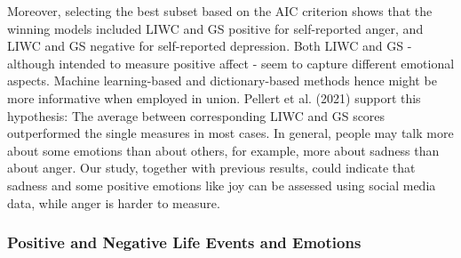 \documentclass[
  english,
  jou,floatsintext]{apa7}
\begin{document}
Moreover, selecting the best subset based on the AIC criterion shows that the winning models included LIWC and GS positive for self-reported anger, and LIWC and GS negative for self-reported depression. Both LIWC and GS - although intended to measure positive affect - seem to capture different emotional aspects. Machine learning-based and dictionary-based methods hence might be more informative when employed in union. Pellert et al. (2021) support this hypothesis: The average between corresponding LIWC and GS scores outperformed the single measures in most cases. In general, people may talk more about some emotions than about others, for example, more about sadness than about anger. Our study, together with previous results, could indicate that sadness and some positive emotions like joy can be assessed using social media data, while anger is harder to measure.

\hypertarget{positive-and-negative-life-events-and-emotions}{%
\subsubsection{Positive and Negative Life Events and Emotions}\label{positive-and-negative-life-events-and-emotions}}
\end{document}
